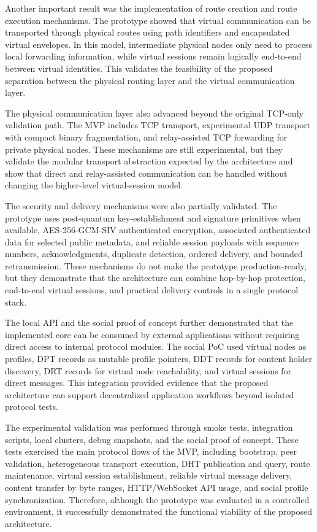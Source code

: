 \documentclass[12pt,a4paper]{article}
\begin{document}
Another important result was the implementation of route creation and route execution mechanisms. The prototype showed that virtual communication can be transported through physical routes using path identifiers and encapsulated virtual envelopes. In this model, intermediate physical nodes only need to process local forwarding information, while virtual sessions remain logically end-to-end between virtual identities. This validates the feasibility of the proposed separation between the physical routing layer and the virtual communication layer.

The physical communication layer also advanced beyond the original TCP-only validation path. The MVP includes TCP transport, experimental UDP transport with compact binary fragmentation, and relay-assisted TCP forwarding for private physical nodes. These mechanisms are still experimental, but they validate the modular transport abstraction expected by the architecture and show that direct and relay-assisted communication can be handled without changing the higher-level virtual-session model.

The security and delivery mechanisms were also partially validated. The prototype uses post-quantum key-establishment and signature primitives when available, AES-256-GCM-SIV authenticated encryption, associated authenticated data for selected public metadata, and reliable session payloads with sequence numbers, acknowledgments, duplicate detection, ordered delivery, and bounded retransmission. These mechanisms do not make the prototype production-ready, but they demonstrate that the architecture can combine hop-by-hop protection, end-to-end virtual sessions, and practical delivery controls in a single protocol stack.

The local API and the social proof of concept further demonstrated that the implemented core can be consumed by external applications without requiring direct access to internal protocol modules. The social PoC used virtual nodes as profiles, DPT records as mutable profile pointers, DDT records for content holder discovery, DRT records for virtual node reachability, and virtual sessions for direct messages. This integration provided evidence that the proposed architecture can support decentralized application workflows beyond isolated protocol tests.

The experimental validation was performed through smoke tests, integration scripts, local clusters, debug snapshots, and the social proof of concept. These tests exercised the main protocol flows of the MVP, including bootstrap, peer validation, heterogeneous transport execution, DHT publication and query, route maintenance, virtual session establishment, reliable virtual message delivery, content transfer by byte ranges, HTTP/WebSocket API usage, and social profile synchronization. Therefore, although the prototype was evaluated in a controlled environment, it successfully demonstrated the functional viability of the proposed architecture.
\end{document}
